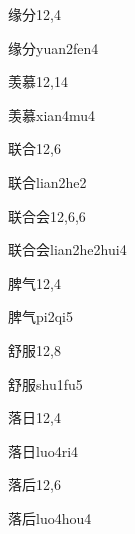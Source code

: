 \begin{entry}{缘分}{12,4}
  \begin{phonetics}{缘分}{yuan2fen4}
  \end{phonetics}
\end{entry}

\begin{entry}{羡慕}{12,14}
  \begin{phonetics}{羡慕}{xian4mu4}
  \end{phonetics}
\end{entry}

\begin{entry}{联合}{12,6}
  \begin{phonetics}{联合}{lian2he2}
  \end{phonetics}
\end{entry}

\begin{entry}{联合会}{12,6,6}
  \begin{phonetics}{联合会}{lian2he2hui4}
  \end{phonetics}
\end{entry}

\begin{entry}{脾气}{12,4}
  \begin{phonetics}{脾气}{pi2qi5}
  \end{phonetics}
\end{entry}

\begin{entry}{舒服}{12,8}
  \begin{phonetics}{舒服}{shu1fu5}
  \end{phonetics}
\end{entry}

\begin{entry}{落日}{12,4}
  \begin{phonetics}{落日}{luo4ri4}
  \end{phonetics}
\end{entry}

\begin{entry}{落后}{12,6}
  \begin{phonetics}{落后}{luo4hou4}
  \end{phonetics}
\end{entry}

